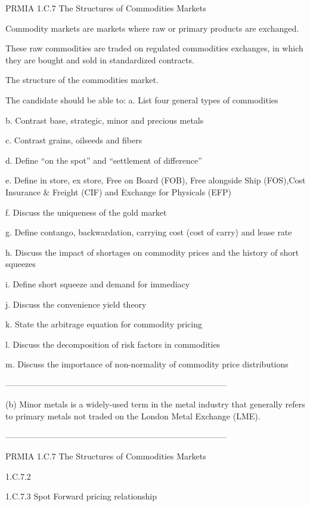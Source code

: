 
PRMIA 1.C.7 The Structures of Commodities Markets


Commodity markets are markets where raw or primary products are exchanged. 

These raw commodities are traded on regulated commodities exchanges, in which they are bought and sold in standardized contracts.


The structure of the commodities market.


The candidate should be able to:
a.
  List four general types of commodities

b.
  Contrast base, strategic, minor and precious metals

c.
  Contrast grains, oilseeds and fibers

d.
  Define “on the spot” and “settlement of difference”

e.
  Define in store, ex store, Free on Board (FOB), Free alongside Ship (FOS),Cost Insurance & Freight (CIF) and Exchange for Physicals (EFP)

f.
  Discuss the uniqueness of the gold market

g.
  Define contango, backwardation, carrying cost (cost of carry) and lease rate

h.
  Discuss the impact of shortages on commodity prices and the history of short squeezes

i.
  Define short squeeze and demand for immediacy

j.
 Discuss the convenience yield theory

k.
  State the arbitrage equation for commodity pricing

l.
  Discuss the decomposition of risk factors in commodities

m.
  Discuss the importance of non-normality of commodity price distributions






--------------------------------------------------------------------------------


(b) Minor metals is a widely-used term in the metal industry that generally refers to primary metals not traded on the London Metal Exchange (LME). 




--------------------------------------------------------------------------------



PRMIA 1.C.7 The Structures of Commodities Markets

1.C.7.2

1.C.7.3 Spot Forward pricing relationship

